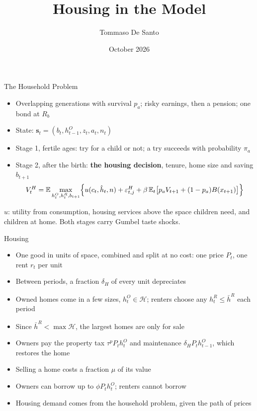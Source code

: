 \documentclass[11pt,aspectratio=169]{beamer}
\title{Housing in the Model}
\author{Tommaso De Santo}
\date{October 2026}
\newcommand{\notation}[1]{\vfill{\linespread{0.95}\scriptsize\color{sourcegray}#1\par}}
\begin{document}
\begin{frame}{The Household Problem}
\footnotesize
\setlength{\abovedisplayskip}{3pt}\setlength{\belowdisplayskip}{3pt}
\begin{itemize}\setlength\itemsep{5pt}
  \item Overlapping generations with survival $p_a$; risky earnings, then a pension; one bond at $R_b$
  \item State: $\mathbf s_t=(b_t,h^O_{t-1},z_t,a_t,n_t)$
  \item Stage 1, fertile ages: try for a child or not; a try succeeds with probability $\pi_a$
  \item Stage 2, after the birth: \textbf{the housing decision}, tenure, home size and saving $b_{t+1}$
  \[
  V^H_t=\mathbb E\max_{h^O_t,h^R_t,b_{t+1}}\Bigl\{u(c_t,\hat h_t,n)+\varepsilon^H_{t,j}+\beta\,\mathbb E_t\bigl[p_aV_{t+1}+(1-p_a)B(x_{t+1})\bigr]\Bigr\}
  \]
\end{itemize}
\notation{$u$: utility from consumption, housing services above the space children need, and children at home. Both stages carry Gumbel taste shocks.}
\end{frame}

\begin{frame}{Housing}
\footnotesize
\begin{itemize}\setlength\itemsep{6pt}
  \item One good in units of space, combined and split at no cost: one price $P_t$, one rent $r_t$ per unit
  \item Between periods, a fraction $\delta_H$ of every unit depreciates
  \item Owned homes come in a few sizes, $h^O_t\in\mathcal H$; renters choose any $h^R_t\le\bar h^R$ each period
  \item Since $\bar h^R<\max\mathcal H$, the largest homes are only for sale
  \item Owners pay the property tax $\tau^pP_th^O_t$ and maintenance $\delta_HP_th^O_{t-1}$, which restores the home
  \item Selling a home costs a fraction $\mu$ of its value
  \item Owners can borrow up to $\phi P_th^O_t$; renters cannot borrow
  \item Housing demand comes from the household problem, given the path of prices
\end{itemize}
\end{frame}
\end{document}
